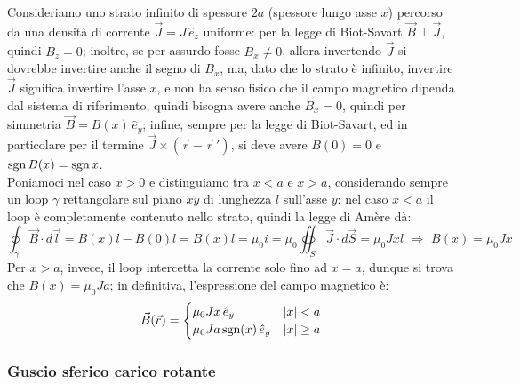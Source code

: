 Consideriamo uno strato infinito di spessore $ 2a $ (spessore lungo asse $ x $) percorso da una densità di corrente $ \vec{J} = J\,\hat{e}_z $ uniforme: per la legge di Biot-Savart $ \vec{B}\perp\vec{J} $, quindi $ B_z = 0 $; inoltre, se per assurdo fosse $ B_x \neq 0 $, allora invertendo $ \vec{J} $ si dovrebbe invertire anche il segno di $ B_x $, ma, dato che lo strato è infinito, invertire $ \vec{J} $ significa invertire l'asse $ x $, e non ha senso fisico che il campo magnetico dipenda dal sistema di riferimento, quindi bisogna avere anche $ B_x = 0 $, quindi per simmetria $ \vec{B} = B(x) \,\hat{e}_y $; infine, sempre per la legge di Biot-Savart, ed in particolare per il termine $ \vec{J}\times(\vec{r} - \vec{r}\,') $, si deve avere $ B(0) = 0 $ e $ \text{sgn}\,B(x) = \text{sgn}\,x $. \\ 
%
Poniamoci nel caso $ x > 0 $ e distinguiamo tra $ x < a $ e $ x > a $, considerando sempre un loop $ \gamma $ rettangolare sul piano $ xy $ di lunghezza $ l $ sull'asse $ y $: nel caso $ x < a $ il loop è completamente contenuto nello strato, quindi la legge di Amère dà:
\begin{equation}
	\oint_{\gamma} \vec{B} \cdot d\vec{l} = B(x)l - B(0)l = B(x)l = \mu_0 i = \mu_0 \oiint_S \vec{J} \cdot d\vec{S} = \mu_0 J x l \,\,\Longrightarrow\,\, B(x) = \mu_0 J x
	\label{eq:}
\end{equation}
Per $ x > a $, invece, il loop intercetta la corrente solo fino ad $ x = a $, dunque si trova che $ B(x) = \mu_0 J a $; in definitiva, l'espressione del campo magnetico è:
\begin{equation}
	\vec{B}(\vec{r}) = 
	\begin{cases}
		\mu_0 J x \, \hat{e}_y & \left\lvert x\right\rvert < a \\ 
		\mu_0 J a \,\text{sgn}(x) \,\hat{e}_y & \left\lvert x\right\rvert \ge a
	\end{cases}
	\label{eq:}
\end{equation}

\subsubsection{Guscio sferico carico rotante}

